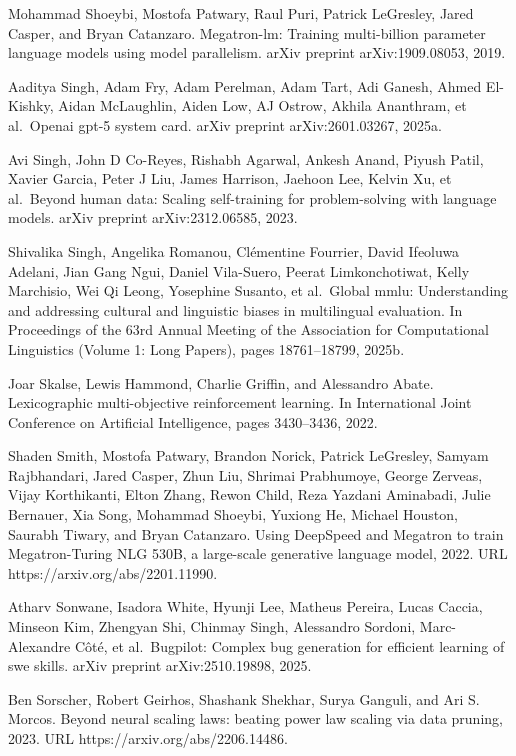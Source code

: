 \documentclass[
  10
]{article}
\begin{document}
Mohammad Shoeybi, Mostofa Patwary, Raul Puri, Patrick LeGresley, Jared
Casper, and Bryan Catanzaro. Megatron-lm: Training multi-billion
parameter language models using model parallelism. arXiv preprint
arXiv:1909.08053, 2019.

Aaditya Singh, Adam Fry, Adam Perelman, Adam Tart, Adi Ganesh, Ahmed
El-Kishky, Aidan McLaughlin, Aiden Low, AJ Ostrow, Akhila Ananthram, et
al.~Openai gpt-5 system card. arXiv preprint arXiv:2601.03267, 2025a.

Avi Singh, John D Co-Reyes, Rishabh Agarwal, Ankesh Anand, Piyush Patil,
Xavier Garcia, Peter J Liu, James Harrison, Jaehoon Lee, Kelvin Xu, et
al.~Beyond human data: Scaling self-training for problem-solving with
language models. arXiv preprint arXiv:2312.06585, 2023.

Shivalika Singh, Angelika Romanou, Clémentine Fourrier, David Ifeoluwa
Adelani, Jian Gang Ngui, Daniel Vila-Suero, Peerat Limkonchotiwat, Kelly
Marchisio, Wei Qi Leong, Yosephine Susanto, et al.~Global mmlu:
Understanding and addressing cultural and linguistic biases in
multilingual evaluation. In Proceedings of the 63rd Annual Meeting of
the Association for Computational Linguistics (Volume 1: Long Papers),
pages 18761--18799, 2025b.

Joar Skalse, Lewis Hammond, Charlie Griffin, and Alessandro Abate.
Lexicographic multi-objective reinforcement learning. In International
Joint Conference on Artificial Intelligence, pages 3430--3436, 2022.

Shaden Smith, Mostofa Patwary, Brandon Norick, Patrick LeGresley, Samyam
Rajbhandari, Jared Casper, Zhun Liu, Shrimai Prabhumoye, George Zerveas,
Vijay Korthikanti, Elton Zhang, Rewon Child, Reza Yazdani Aminabadi,
Julie Bernauer, Xia Song, Mohammad Shoeybi, Yuxiong He, Michael Houston,
Saurabh Tiwary, and Bryan Catanzaro. Using DeepSpeed and Megatron to
train Megatron-Turing NLG 530B, a large-scale generative language model,
2022. URL https://arxiv.org/abs/2201.11990.

Atharv Sonwane, Isadora White, Hyunji Lee, Matheus Pereira, Lucas
Caccia, Minseon Kim, Zhengyan Shi, Chinmay Singh, Alessandro Sordoni,
Marc-Alexandre Côté, et al.~Bugpilot: Complex bug generation for
efficient learning of swe skills. arXiv preprint arXiv:2510.19898, 2025.

Ben Sorscher, Robert Geirhos, Shashank Shekhar, Surya Ganguli, and Ari
S. Morcos. Beyond neural scaling laws: beating power law scaling via
data pruning, 2023. URL https://arxiv.org/abs/2206.14486.
\end{document}
